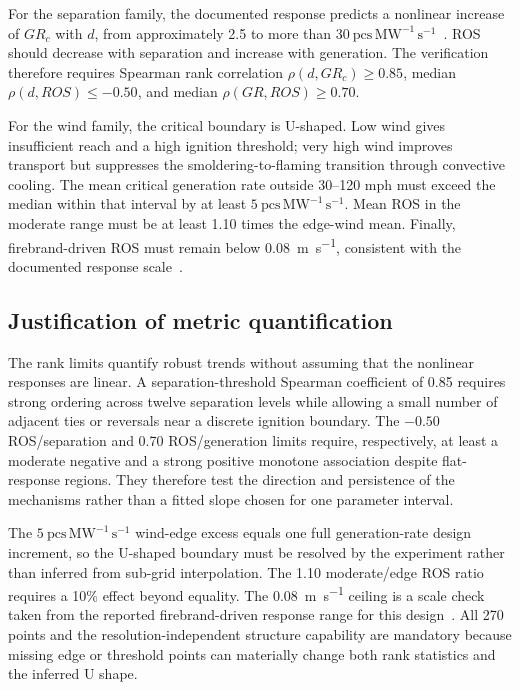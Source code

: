For the separation family, the documented response predicts a nonlinear
increase of \(GR_{c}\) with \(d\), from approximately 2.5 to more than
\(30\ \mathrm{pcs\,MW^{-1}\,s^{-1}}\)~\cite{Qin2025,QinEtAl2026}. ROS
should decrease with separation
and increase with generation. The verification therefore requires Spearman
rank correlation \(\rho(d,GR_{c})\ge0.85\), median
\(\rho(d,ROS)\le-0.50\), and median \(\rho(GR,ROS)\ge0.70\).

For the wind family, the critical boundary is U-shaped. Low wind gives
insufficient reach and a high ignition threshold; very high wind improves
transport but suppresses the smoldering-to-flaming transition through
convective cooling. The mean critical generation rate outside 30--120 mph
must exceed the median within that interval by at least
\(5\ \mathrm{pcs\,MW^{-1}\,s^{-1}}\). Mean ROS in the moderate range must
be at least 1.10 times the edge-wind mean. Finally, firebrand-driven ROS must
remain below \SI{0.08}{m.s^{-1}}, consistent with the documented response
scale~\cite{Qin2025,QinEtAl2026}.


\subsection{Justification of metric quantification}

The rank limits quantify robust trends without assuming that the nonlinear
responses are linear.  A separation-threshold Spearman coefficient of 0.85
requires strong ordering across twelve separation levels while allowing a
small number of adjacent ties or reversals near a discrete ignition boundary.
The \(-0.50\) ROS/separation and 0.70 ROS/generation limits require,
respectively, at least a moderate negative and a strong positive monotone
association despite flat-response regions.  They therefore test the direction
and persistence of the mechanisms rather than a fitted slope chosen for one
parameter interval.

The \(5\ \mathrm{pcs\,MW^{-1}\,s^{-1}}\) wind-edge excess equals one full
generation-rate design increment, so the U-shaped boundary must be resolved by
the experiment rather than inferred from sub-grid interpolation.  The 1.10
moderate/edge ROS ratio requires a 10\% effect beyond equality.  The
\SI{0.08}{m.s^{-1}} ceiling is a scale check taken from the reported
firebrand-driven response range for this design~\cite{Qin2025,QinEtAl2026}.
All 270 points and the resolution-independent structure capability are
mandatory because missing edge or threshold points can materially change both
rank statistics and the inferred U shape.

